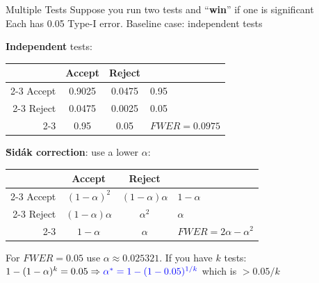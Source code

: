 \begin{frame}{Multiple Tests}
Suppose you run two tests and {\color{red}``\textbf{win}''} if one is significant\\
Each has 0.05 Type-I error. Baseline case: independent tests
\begin{center}
    \textbf{Independent} tests:\\
     \begin{tabular}{r|c|c|l}
          \multicolumn{1}{r}{ } & \multicolumn{1}{c}{Accept} & \multicolumn{1}{c}{Reject} & \\
          \cline{2-3}
           Accept & {\color{olive}0.9025} & {\color{red} 0.0475} & 0.95 \\
          \cline{2-3}
          Reject & {\color{red} 0.0475} & {\color{red} 0.0025} & 0.05 \\
          \cline{2-3}
          \multicolumn{1}{r}{ }  & \multicolumn{1}{c}{0.95}  & \multicolumn{1}{c}{0.05} &  {\color{red}$FWER=0.0975$}
     \end{tabular}
\end{center}
{\color{blue}\textbf{\u{S}id\'{a}k correction}}: use a lower $\alpha$:
\begin{center}
     \begin{tabular}{r|c|c|l}
          \multicolumn{1}{r}{ } & \multicolumn{1}{c}{Accept} & \multicolumn{1}{c}{Reject} & \\
          \cline{2-3}
           Accept & {\color{olive}$(1-\alpha)^2$} & {\color{red} $(1-\alpha)\alpha$} & $1-\alpha$ \\
          \cline{2-3}
          Reject & {\color{red} $(1-\alpha)\alpha$} & {\color{red} $\alpha^2$} & $\alpha$ \\
          \cline{2-3}
          \multicolumn{1}{r}{ }  & \multicolumn{1}{c}{$1-\alpha$}  & \multicolumn{1}{c}{$\alpha$} &  {\color{red}$FWER=2\alpha - \alpha^2$}
     \end{tabular}
\end{center}
For $FWER=0.05$ use $\alpha \approx 0.025321$. If you have $k$ tests:\\
$1-(1-\alpha)^k=0.05 \Rightarrow {\color{blue}\alpha^* = 1-(1-0.05)^{1/k}}$ which is $>0.05/k$
\end{frame}


